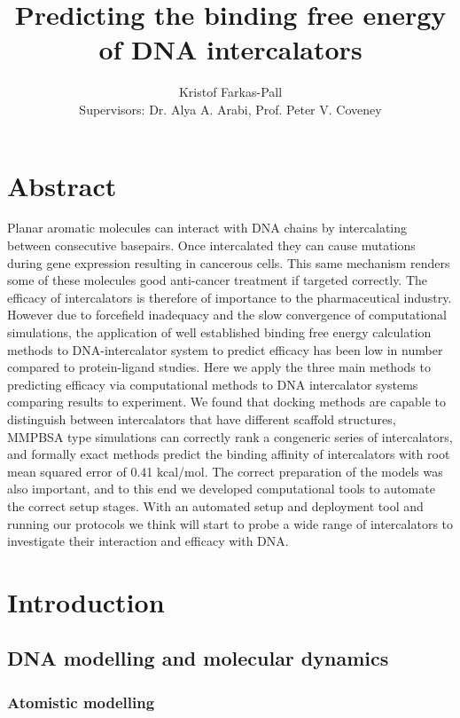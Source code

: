 \documentclass[11pt, a4paper]{report}
\title{Predicting the binding free energy of DNA intercalators}
\author{Kristof Farkas-Pall \\ Supervisors: Dr. Alya A. Arabi, Prof. Peter V. Coveney}
\begin{document}
\maketitle

\tableofcontents

\chapter*{Abstract}

Planar aromatic molecules can interact with DNA chains by intercalating between consecutive basepairs. Once intercalated they can cause mutations during gene expression resulting in cancerous cells. This same mechanism renders some of these molecules good anti-cancer treatment if targeted correctly. The efficacy of intercalators is therefore of importance to the pharmaceutical industry. However due to forcefield inadequacy and the slow convergence of computational simulations, the application of well established binding free energy calculation methods to DNA-intercalator system to predict efficacy has been low in number compared to protein-ligand studies. Here we apply the three main methods to predicting efficacy via computational methods to DNA intercalator systems comparing results to experiment. We found that docking methods are capable to distinguish between intercalators that have different scaffold structures, MMPBSA type simulations can correctly rank a congeneric series of intercalators, and formally exact methods predict the binding affinity of intercalators with root mean squared error of 0.41 kcal/mol. The correct preparation of the models was also important, and to this end we developed computational tools to automate the correct setup stages. With an automated setup and deployment tool and running our protocols we think will start to probe a wide range of intercalators to investigate their interaction and efficacy with DNA.

\chapter{Introduction}



\section{DNA modelling and molecular dynamics}

\subsection{Atomistic modelling}
\end{document}

